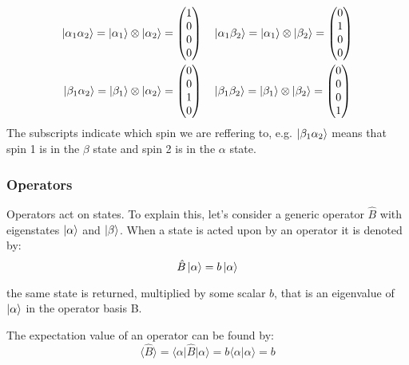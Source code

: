 \begin{align}\label{eqn:2spinstates}
\ket{\alpha_{1}\alpha_{2}} = \ket{\alpha_1} \otimes \ket{\alpha_2} = \begin{pmatrix}
  1\\
  0\\
  0\\
  0
\end{pmatrix} &\quad
\ket{\alpha_{1}\beta_{2}} = \ket{\alpha_1} \otimes \ket{\beta_2} = \begin{pmatrix}
  0\\
  1\\
  0\\
  0
\end{pmatrix}\\
\ket{\beta_{1}\alpha_{2}} = \ket{\beta_1} \otimes \ket{\alpha_2} = \begin{pmatrix}
  0\\
  0\\
  1\\
  0
\end{pmatrix} &\quad
\ket{\beta_{1}\beta_{2}} = \ket{\beta_1} \otimes \ket{\beta_2} = \begin{pmatrix}
  0\\
  0\\
  0\\
  1
\end{pmatrix}
\end{align}
The subscripts indicate which spin we are reffering to, e.g. $\ket{\beta_1\alpha_2}$ means that
spin 1 is in the $\beta$ state and spin 2 is in the $\alpha$ state.

\subsubsection{Operators}

Operators act on states. To explain this, let's consider a generic operator $\hat{B}$ with eigenstates $\ket{\alpha}$ and $\ket{\beta}$. When a state is acted upon by an operator it is denoted by:
\begin{equation}
  \hat{B}\ket{\alpha} = b\ket{\alpha}
\end{equation}

the same state is returned, multiplied by some scalar $b$, that is an eigenvalue of $\ket{\alpha}$
in the operator basis B.

The expectation value of an operator can be found by:
\begin{equation}\label{eqn:expectation}
  \langle\hat{B}\rangle = \langle\alpha\vert\hat{B}\vert\alpha\rangle = b\langle\alpha\vert\alpha\rangle = b
\end{equation}

